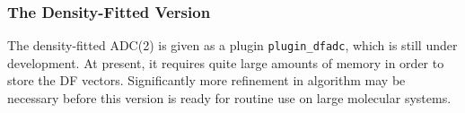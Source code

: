\subsubsection{The Density-Fitted Version}
The density-fitted ADC(2) is given as a plugin \verb|plugin_dfadc|,
which is still under development.  At present, it requires quite large
amounts of memory in order to store the DF vectors. Significantly more
refinement in algorithm may be necessary before this version is ready
for routine use on large molecular systems.

